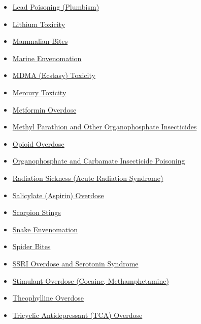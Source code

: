 \begin{itemize}[noitemsep]
  \item \hyperlink{sec:Lead Poisoning}{Lead Poisoning (Plumbism)}
  \item \hyperlink{sec:Lithium Toxicity}{Lithium Toxicity}
  \item \hyperlink{sec:Mammalian Bites}{Mammalian Bites}
  \item \hyperlink{sec:Marine Envenomation}{Marine Envenomation}
  \item \hyperlink{sec:MDMA Toxicity}{MDMA (Ecstasy) Toxicity}
  \item \hyperlink{sec:Mercury Toxicity}{Mercury Toxicity}
  \item \hyperlink{sec:Metformin Overdose}{Metformin Overdose}
  \item \hyperlink{sec:Methyl Parathion}{Methyl Parathion and Other Organophosphate Insecticides}
  \item \hyperlink{sec:Opioid Overdose}{Opioid Overdose}
  \item \hyperlink{sec:Organophosphate Poisoning}{Organophosphate and Carbamate Insecticide Poisoning}
  \item \hyperlink{sec:Radiation Sickness}{Radiation Sickness (Acute Radiation Syndrome)}
  \item \hyperlink{sec:Salicylate Overdose}{Salicylate (Aspirin) Overdose}
  \item \hyperlink{sec:Scorpion Stings}{Scorpion Stings}
  \item \hyperlink{sec:Snake Envenomation}{Snake Envenomation}
  \item \hyperlink{sec:Spider Bites}{Spider Bites}
  \item \hyperlink{sec:SSRI Overdose}{SSRI Overdose and Serotonin Syndrome}
  \item \hyperlink{sec:Stimulant Overdose}{Stimulant Overdose (Cocaine, Methamphetamine)}
  \item \hyperlink{sec:Theophylline Overdose}{Theophylline Overdose}
  \item \hyperlink{sec:TCA Overdose}{Tricyclic Antidepressant (TCA) Overdose}
\end{itemize}

\clearpage
